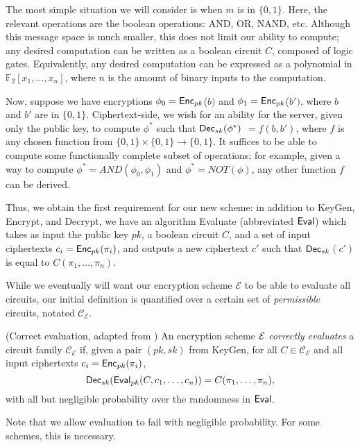 The most simple situation we will consider is when $m$ is in $\{0, 1\}.$ Here, the relevant operations are the boolean operations: AND, OR, NAND, etc. Although this message space is much smaller, this does not limit our ability to compute; any desired computation can be written as a boolean circuit $C$, composed of logic gates. Equivalently, any desired computation can be expressed as a polynomial in $\mathbb{F}_2[x_1, \dots, x_n]$, where $n$ is the amount of binary inputs to the computation.

Now, suppose we have encryptions $\phi_0 = {\sf Enc}_{pk}$($b)$ and $\phi_1 = {\sf Enc}_{pk}$($b')$, where $b$ and $b'$ are in $\{0,1\}$. Ciphertext-side, we wish for an ability for the server, given only the public key, to compute $\phi^*$ such that ${\sf Dec}_{sk}(\phi^*)$ $= f(b, b')$, where $f$ is any chosen function from $\{0,1\} \times \{0,1\} \to \{0,1\}$. It suffices to be able to compute some functionally complete subset of operations; for example, given a way to compute $\phi^* = \textit{AND}(\phi_0, \phi_1)$ and $\phi^* = \textit{NOT}(\phi)$, any other function $f$ can be derived.

Thus, we obtain the first requirement for our new scheme: in addition to KeyGen, Encrypt, and Decrypt, we have an algorithm Evaluate (abbreviated ${\sf Eval}$) which takes as input the public key $pk$, a boolean circuit $C$, and a set of input ciphertexts $c_i = {\sf Enc}_{pk}(\pi_i)$, and outputs a new ciphertext $c'$ such that ${\sf Dec}_{sk}$$(c')$ is equal to $C(\pi_1, \dots, \pi_n)$.

While we eventually will want our encryption scheme $\mathcal{E}$ to be able to evaluate all circuits, our initial definition is quantified over a certain set of \emph{permissible} circuits, notated $\mathcal{C}_\mathcal{E}$.


\begin{definition} (Correct evaluation, adapted from \cite{gentry2009fully})
An encryption scheme $\mathcal{E}$ \emph{correctly evaluates} a circuit family $\mathcal{C}_\mathcal{E}$ if, given a pair $(pk, sk)$ from KeyGen, for all $C \in \mathcal{C}_\mathcal{E}$ and all input ciphertexts $c_i = {\sf Enc}_{pk}(\pi_i)$,
\[{\sf Dec}_{sk}({\sf Eval}_{pk} (C, c_1, \dots, c_n)) = C(\pi_1, \dots, \pi_n),\]
with all but negligible probability over the randomness in ${\sf Eval}$.
\end{definition}


Note that we allow evaluation to fail with negligible probability. For some schemes, this is necessary.

